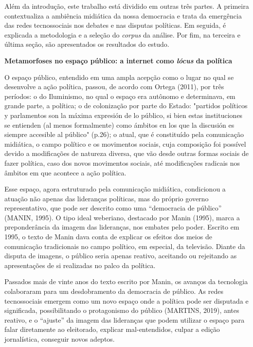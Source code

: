 Além da introdução, este trabalho está dividido em outras três partes. A
primeira contextualiza a ambiência midiática da nossa democracia e trata
da emergência das redes tecnossociais nos debates e nas disputas
políticas. Em seguida, é explicada a metodologia e a seleção do
\emph{corpus} da análise. Por fim, na terceira e última seção, são
apresentados os resultados do estudo.

\textbf{Metamorfoses no espaço público: a internet como \emph{lócus} da
política}

O espaço público, entendido em uma ampla acepção como o lugar no qual se
desenvolve a ação política, passou, de acordo com Ortega (2011), por
três períodos: o do Iluminismo, no qual o espaço era autônomo e
determinava, em grande parte, a política; o de colonização por parte do
Estado: "partidos políticos y parlamentos son la máxima expresión de lo
público, si bien estas instituciones se entienden (al menos formalmente)
como ámbitos en los que la discusión es siempre accesible al público"
(p.26); o atual, que é constituído pela comunicação midiática, o campo
político e os movimentos sociais, cuja composição foi possível devido a
modificações de natureza diversa, que vão desde outras formas sociais de
fazer política, caso dos novos movimentos sociais, até modificações
radicais nos âmbitos em que acontece a ação política.

Esse espaço, agora estruturado pela comunicação midiática, condicionou a
atuação não apenas das lideranças políticas, mas do próprio governo
representativo, que pode ser descrito como uma ``democracia de público''
(MANIN, 1995). O tipo ideal weberiano, destacado por Manin (1995), marca
a preponderância da imagem das lideranças, nos embates pelo poder.
Escrito em 1995, o texto de Manin dava conta de explicar os efeitos dos
meios de comunicação tradicionais no campo político, em especial, da
televisão. Diante da disputa de imagens, o público seria apenas reativo,
aceitando ou rejeitando as apresentações de si realizadas no palco da
política.

Passados mais de vinte anos do texto escrito por Manin, os avanços da
tecnologia colaboraram para um desdobramento da democracia de público.
As redes tecnossociais emergem como um novo espaço onde a política pode
ser disputada e significada, possibilitando o protagonismo do público
(MARTINS, 2019), antes reativo, e o ``ajuste'' da imagem das lideranças
que podem utilizar o espaço para falar diretamente ao eleitorado,
explicar mal-entendidos, culpar a edição jornalística, conseguir novos
adeptos.

